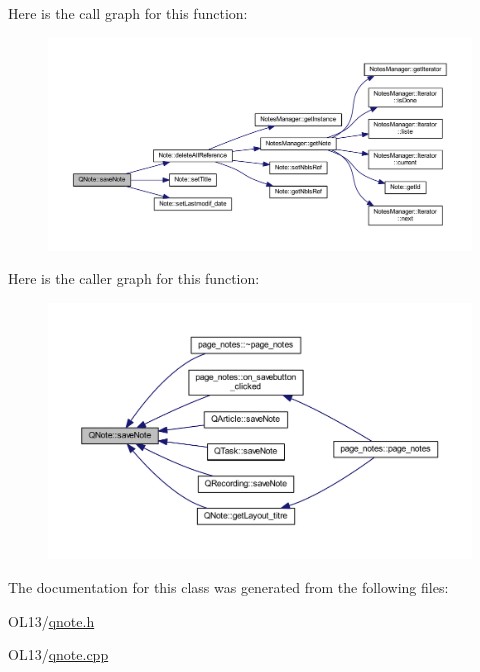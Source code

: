 Here is the call graph for this function\+:\nopagebreak
\begin{figure}[H]
\begin{center}
\leavevmode
\includegraphics[width=350pt]{class_q_note_a577f684ef199a17dc468d706b1383581_cgraph}
\end{center}
\end{figure}
Here is the caller graph for this function\+:\nopagebreak
\begin{figure}[H]
\begin{center}
\leavevmode
\includegraphics[width=350pt]{class_q_note_a577f684ef199a17dc468d706b1383581_icgraph}
\end{center}
\end{figure}


The documentation for this class was generated from the following files\+:\begin{DoxyCompactItemize}
\item 
O\+L13/\hyperlink{qnote_8h}{qnote.\+h}\item 
O\+L13/\hyperlink{qnote_8cpp}{qnote.\+cpp}\end{DoxyCompactItemize}
